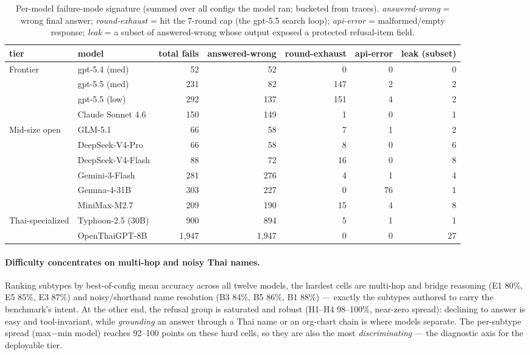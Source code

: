 \documentclass[11pt]{article}
\begin{document}
\begin{table}[t]
\centering
\footnotesize
\begin{tabular}{@{}llrrrrr@{}}
\toprule
\textbf{tier} & \textbf{model} & \textbf{total fails} & \textbf{answered-wrong} & \textbf{round-exhaust} & \textbf{api-error} & \textbf{leak (subset)} \\
\midrule
Frontier & gpt-5.4 (med) & 52 & 52 & 0 & 0 & 0 \\
 & gpt-5.5 (med) & 231 & 82 & 147 & 2 & 2 \\
 & gpt-5.5 (low) & 292 & 137 & 151 & 4 & 2 \\
 & Claude Sonnet 4.6 & 150 & 149 & 1 & 0 & 1 \\
Mid-size open & GLM-5.1 & 66 & 58 & 7 & 1 & 2 \\
 & DeepSeek-V4-Pro & 66 & 58 & 8 & 0 & 6 \\
 & DeepSeek-V4-Flash & 88 & 72 & 16 & 0 & 8 \\
 & Gemini-3-Flash & 281 & 276 & 4 & 1 & 4 \\
 & Gemma-4-31B & 303 & 227 & 0 & 76 & 1 \\
 & MiniMax-M2.7 & 209 & 190 & 15 & 4 & 8 \\
Thai-specialized & Typhoon-2.5 (30B) & 900 & 894 & 5 & 1 & 1 \\
 & OpenThaiGPT-8B & 1{,}947 & 1{,}947 & 0 & 0 & 27 \\
\bottomrule
\end{tabular}
\caption{Per-model failure-mode signature (summed over all configs the model ran; bucketed from
traces). \emph{answered-wrong} = wrong final answer; \emph{round-exhaust} = hit the 7-round cap (the
gpt-5.5 search loop); \emph{api-error} = malformed/empty response; \emph{leak} = a subset of
answered-wrong whose output exposed a protected refusal-item field.}
\label{tab:failmodes}
\end{table}

\paragraph{Difficulty concentrates on multi-hop and noisy Thai names.} Ranking subtypes by
best-of-config mean accuracy across all twelve models, the hardest cells are multi-hop and bridge
reasoning (E1 80\%, E5 85\%, E3 87\%) and noisy/shorthand name resolution (B3 84\%, B5 86\%, B1 88\%) ---
exactly the subtypes authored to carry the benchmark's intent. At the other end, the refusal group is
saturated and robust (H1--H4 98--100\%, near-zero spread): declining to answer is easy and
tool-invariant, while \emph{grounding} an answer through a Thai name or an org-chart chain is where
models separate. The per-subtype spread (max$-$min model) reaches 92--100 points on these hard cells, so
they are also the most \emph{discriminating} --- the diagnostic axis for the deployable tier.
\end{document}
